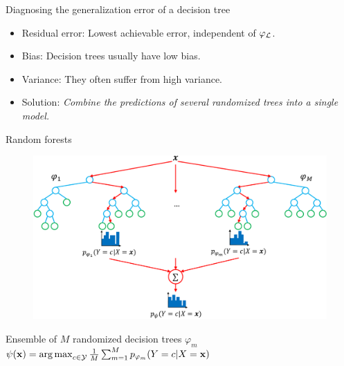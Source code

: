 \documentclass{beamer}
\DeclareMathOperator*{\argmax}{arg\,max}
\begin{document}
\begin{frame}{Diagnosing the generalization error of a decision tree}

\begin{itemize}
\item Residual error: Lowest achievable error, independent of $\varphi_{\cal L}$.
\item Bias: Decision trees usually have {\color{blue} low bias}.
\item Variance: They often suffer from {\color{red} high variance}.
\end{itemize}

\begin{itemize}
\item Solution: {\it Combine the predictions of several randomized trees into a single model.}
\end{itemize}

\end{frame}



\begin{frame}{Random forests}
\begin{figure}
    \includegraphics[scale=0.5]{./figures/forest.pdf}
\end{figure}

Ensemble of $M$ randomized decision trees $\varphi_m$\\
$\psi(\mathbf{x}) = \argmax_{c \in {\cal Y}} \frac{1}{M} \sum_{m=1}^M p_{\varphi_m}(Y = c | X = \mathbf{x})$
\end{frame}
\end{document}
